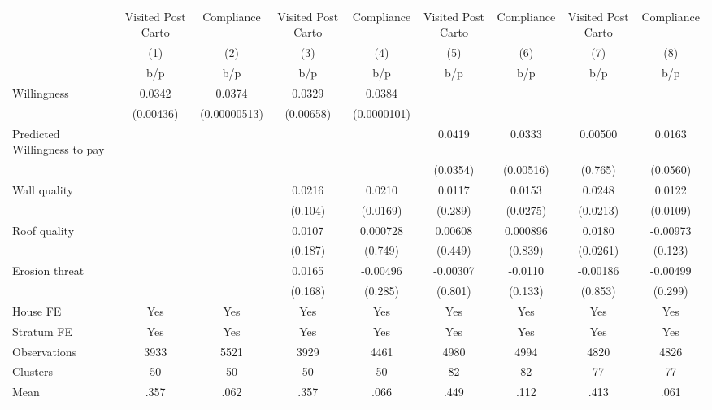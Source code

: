 {
\def\sym#1{\ifmmode^{#1}\else\(^{#1}\)\fi}
\begin{tabular}{l*{8}{c}}
\toprule
                &\multicolumn{1}{c}{Visited Post Carto}&\multicolumn{1}{c}{Compliance}&\multicolumn{1}{c}{Visited Post Carto}&\multicolumn{1}{c}{Compliance}&\multicolumn{1}{c}{Visited Post Carto}&\multicolumn{1}{c}{Compliance}&\multicolumn{1}{c}{Visited Post Carto}&\multicolumn{1}{c}{Compliance}\\
                &\multicolumn{1}{c}{(1)}&\multicolumn{1}{c}{(2)}&\multicolumn{1}{c}{(3)}&\multicolumn{1}{c}{(4)}&\multicolumn{1}{c}{(5)}&\multicolumn{1}{c}{(6)}&\multicolumn{1}{c}{(7)}&\multicolumn{1}{c}{(8)}\\
                &      b/p&      b/p&      b/p&      b/p&      b/p&      b/p&      b/p&      b/p\\
\midrule
Willingness     &   0.0342&   0.0374&   0.0329&   0.0384&         &         &         &         \\
                &(0.00436)&(0.00000513)&(0.00658)&(0.0000101)&         &         &         &         \\
Predicted Willingness to pay&         &         &         &         &   0.0419&   0.0333&  0.00500&   0.0163\\
                &         &         &         &         & (0.0354)&(0.00516)&  (0.765)& (0.0560)\\
Wall quality    &         &         &   0.0216&   0.0210&   0.0117&   0.0153&   0.0248&   0.0122\\
                &         &         &  (0.104)& (0.0169)&  (0.289)& (0.0275)& (0.0213)& (0.0109)\\
Roof quality    &         &         &   0.0107& 0.000728&  0.00608& 0.000896&   0.0180& -0.00973\\
                &         &         &  (0.187)&  (0.749)&  (0.449)&  (0.839)& (0.0261)&  (0.123)\\
Erosion threat  &         &         &   0.0165& -0.00496& -0.00307&  -0.0110& -0.00186& -0.00499\\
                &         &         &  (0.168)&  (0.285)&  (0.801)&  (0.133)&  (0.853)&  (0.299)\\
House FE        &      Yes&      Yes&      Yes&      Yes&      Yes&      Yes&      Yes&      Yes\\
Stratum FE      &      Yes&      Yes&      Yes&      Yes&      Yes&      Yes&      Yes&      Yes\\
\midrule
Observations    &     3933&     5521&     3929&     4461&     4980&     4994&     4820&     4826\\
Clusters        &       50&       50&       50&       50&       82&       82&       77&       77\\
Mean            &     .357&     .062&     .357&     .066&     .449&     .112&     .413&     .061\\
\bottomrule
\end{tabular}
}
